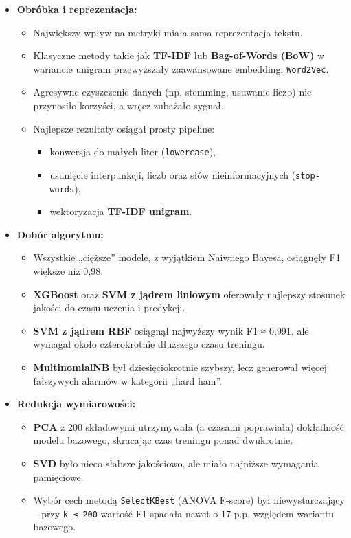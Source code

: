 \documentclass{article}
\begin{document}
\begin{itemize}
    \item \textbf{Obróbka i reprezentacja:}
    \begin{itemize}
        \item Największy wpływ na metryki miała sama reprezentacja tekstu.
        \item Klasyczne metody takie jak \textbf{TF-IDF} lub \textbf{Bag-of-Words (BoW)} w wariancie unigram przewyższały zaawansowane embeddingi \texttt{Word2Vec}.
        \item Agresywne czyszczenie danych (np. stemming, usuwanie liczb) nie przynosiło korzyści, a wręcz zubażało sygnał.
        \item Najlepsze rezultaty osiągał prosty pipeline:
        \begin{itemize}
            \item konwersja do małych liter (\texttt{lowercase}),
            \item usunięcie interpunkcji, liczb oraz słów nieinformacyjnych (\texttt{stop-words}),
            \item wektoryzacja \textbf{TF-IDF unigram}.
        \end{itemize}
    \end{itemize}
    
    \item \textbf{Dobór algorytmu:}
    \begin{itemize}
        \item Wszystkie „cięższe” modele, z wyjątkiem Naiwnego Bayesa, osiągnęły F1 większe niż 0{,}98.
        \item \textbf{XGBoost} oraz \textbf{SVM z jądrem liniowym} oferowały najlepszy stosunek jakości do czasu uczenia i predykcji.
        \item \textbf{SVM z jądrem RBF} osiągnął najwyższy wynik F1 ≈ 0{,}991, ale wymagał około czterokrotnie dłuższego czasu treningu.
        \item \textbf{MultinomialNB} był dziesięciokrotnie szybszy, lecz generował więcej fałszywych alarmów w kategorii „hard ham”.
    \end{itemize}

    \item \textbf{Redukcja wymiarowości:}
    \begin{itemize}
        \item \textbf{PCA} z 200 składowymi utrzymywała (a czasami poprawiała) dokładność modelu bazowego, skracając czas treningu ponad dwukrotnie.
        \item \textbf{SVD} było nieco słabsze jakościowo, ale miało najniższe wymagania pamięciowe.
        \item Wybór cech metodą \texttt{SelectKBest} (ANOVA F-score) był niewystarczający -- przy \texttt{k ≤ 200} wartość F1 spadała nawet o 17 p.p. względem wariantu bazowego.
    \end{itemize}
\end{itemize}
\end{document}
